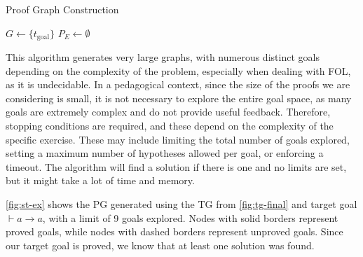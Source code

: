 \begin{algorithm}
\caption{Proof Graph Construction}
\label{alg:pg-construction}

$G \leftarrow \{t_\text{goal}\}$
$P_E \leftarrow \emptyset$

\end{algorithm}

This algorithm generates very large graphs, with numerous distinct goals depending on the complexity of the problem, especially when dealing with FOL, as it is undecidable. In a pedagogical context, since the size of the proofs we are considering is small, it is not necessary to explore the entire goal space, as many goals are extremely complex and do not provide useful feedback. Therefore, stopping conditions are required, and these depend on the complexity of the specific exercise. These may include limiting the total number of goals explored, setting a maximum number of hypotheses allowed per goal, or enforcing a timeout. The algorithm will find a solution if there is one and no limits are set, but it might take a lot of time and memory.

\autoref{fig:st-ex} shows the PG generated using the TG from \autoref{fig:tg-final} and target goal \(\vdash a \to a\), with a limit of 9 goals explored. Nodes with solid borders represent proved goals, while nodes with dashed borders represent unproved goals. Since our target goal is proved, we know that at least one solution was found.

